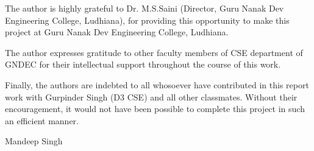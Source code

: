 \begin{Large}
\end{Large}
The author is highly grateful to Dr. M.S.Saini (Director, Guru
Nanak Dev Engineering College, Ludhiana), for providing this
opportunity to make this project at Guru Nanak Dev Engineering College, 
Ludhiana.

\noindent The author expresses gratitude to other faculty members of CSE department 
of GNDEC for their intellectual support throughout the course of this 
work.

\noindent Finally, the authors are indebted to all whosoever have contributed in
this report work with Gurpinder Singh (D3 CSE) and all other classmates. Without their 
encouragement, it would not have been possible to complete this project
in such an efficient manner.

\vskip 1.0cm 
\noindent Mandeep Singh
